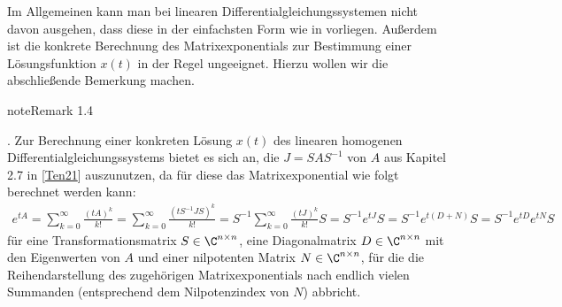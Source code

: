 \documentclass[letterpaper,10pt,english]{jupyterBook}
\begin{document}
\sphinxAtStartPar
Im Allgemeinen kann man bei linearen Differentialgleichungssystemen nicht davon ausgehen, dass diese in der einfachsten Form wie in {\hyperref[\detokenize{ode/repetition:equation-eq-lin-hom-dglsystem}]{}} vorliegen.
Außerdem ist die konkrete Berechnung des Matrixexponentials zur Bestimmung einer Lösungsfunktion \(x(t)\) in der Regel ungeeignet.
Hierzu wollen wir die abschließende Bemerkung machen.
\label{ode/repetition:remark-16}
\begin{sphinxadmonition}{note}{Remark 1.4}



. Zur Berechnung einer konkreten Lösung \(x(t)\) des linearen homogenen Differentialgleichungssystems {\hyperref[\detokenize{ode/repetition:equation-eq-lin-hom-dglsystem}]{}} bietet es sich an, die  \(J = SAS^{-1}\) von \(A\) aus Kapitel 2.7 in {[}\hyperlink{cite.references:id12}{Ten21}{]} auszunutzen, da für diese das Matrixexponential wie folgt berechnet werden kann:
\begin{equation*}
\begin{split}e^{tA} =  \sum_{k=0}^\infty \frac{(t A)^k}{k!} = \sum_{k=0}^\infty \frac{(tS^{-1}JS)^k}{k!} = S^{-1} \sum_{k=0}^\infty \frac{(tJ)^k}{k!} S = S^{-1} e^{tJ}S = S^{-1} e^{t(D+N)}S = S^{-1} e^{tD} e^{tN} S\end{split}
\end{equation*}
\sphinxAtStartPar
für eine Transformationsmatrix \(S \in \C^{n \times n}\), eine Diagonalmatrix \(D \in \C^{n \times n}\) mit den Eigenwerten von \(A\) und einer nilpotenten Matrix \(N \in \C^{n \times n}\), für die die Reihendarstellung des zugehörigen Matrixexponentials nach endlich vielen Summanden (entsprechend dem Nilpotenzindex von \(N\)) abbricht.


\end{sphinxadmonition}
\end{document}
